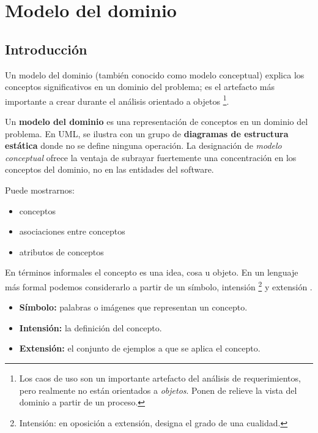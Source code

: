 \newpage %

%
%
\section{Modelo del dominio} %
	\label{sec:modelo_del_dominio}

%
%
\subsection{Introducción} %
	\label{sub:md_introduccion}
	
	Un modelo del dominio (también conocido como modelo conceptual) explica los conceptos significativos en un dominio del problema; es el artefacto más importante a crear durante el análisis orientado a objetos \footnote{Los caos de uso son un importante artefacto del análisis de requerimientos, pero realmente no están orientados a {\it objetos}. Ponen de relieve la vista del dominio a partir de un proceso.}. 
	
	Un {\bf modelo del dominio} es una representación de conceptos en un dominio del problema\cite{Fowler96}\cite{MO95}. En UML, se ilustra con un grupo de {\bf diagramas de estructura estática} donde no se define ninguna operación. La designación de {\it modelo conceptual} ofrece la ventaja de subrayar fuertemente una concentración en los conceptos del dominio, no en las entidades del software.
	
	Puede mostrarnos:
	\begin{itemize}
		\item{conceptos}
		\item{asociaciones entre conceptos}
		\item{atributos de conceptos}
	\end{itemize}
	
	En términos informales el concepto es una idea, cosa u objeto. En un lenguaje más formal podemos considerarlo a partir de un símbolo, intensión \footnote{Intensión: en oposición a extensión, designa el grado de una cualidad.} y extensión \cite{MO95}.
	
	\begin{itemize}
		\item{{\bf Símbolo:} palabras o imágenes que representan un concepto.}
		\item{{\bf Intensión:} la definición del concepto.}
		\item{{\bf Extensión:} el conjunto de ejemplos a que se aplica el concepto.}
	\end{itemize}
	
